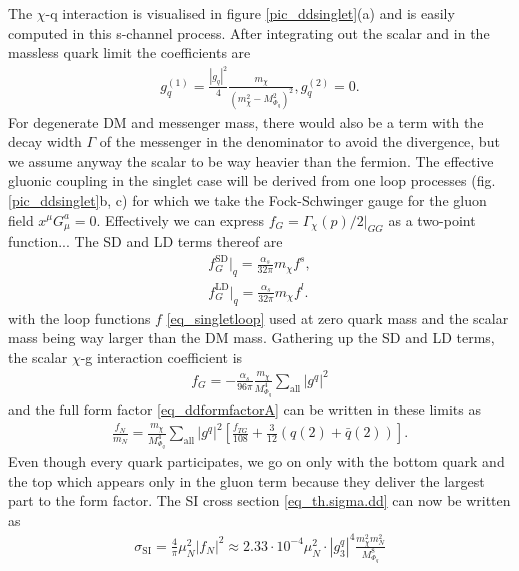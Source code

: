 The $\chi$-q interaction is visualised in figure \ref{pic_ddsinglet}(a) and is easily computed in this s-channel process. After integrating out the 
scalar and in the massless quark limit the coefficients are
\begin{align}
 g_q^{(1)} = \frac{|g_q|^2 }{4} \frac{m_\chi}{\left(m_\chi^2 - M_{\Phi_q}^2\right)^2},
 g_q^{(2)} = 0.
\end{align}
For degenerate DM and messenger mass, there would also be a term with the decay width $\Gamma$ of the messenger in the denominator to avoid the 
divergence, but we assume anyway the scalar to be way heavier than the fermion. %
The effective gluonic coupling in the 
singlet case will be derived from one loop processes (fig. \ref{pic_ddsinglet}b, c) 
for which we take the Fock-Schwinger gauge for the gluon
field $x^\mu G^a_\mu = 0$. Effectively we can express $f_G = \Gamma_\chi(p)/2|_{GG}$ as a two-point function... The SD and LD terms thereof are
\begin{align}
 f_G^\text{SD}|_q = \frac{\alpha_s}{32\pi} m_\chi f^s,\\
 f_G^\text{LD}|_q = \frac{\alpha_s}{32\pi} m_\chi f^l.
 \label{eq_ldsdLoop}
\end{align}
with the loop functions $f$ \eqref{eq_singletloop} used at zero quark mass and the scalar mass being way larger than the DM mass.
Gathering up the SD and LD terms, the scalar $\chi$-g interaction coefficient is
\begin{align}
 f_G = -\frac{\alpha_s}{96\pi} \frac{m_\chi}{M_{\Phi_q}^4} \sum\limits_{\text{all}} |g^q|^2
\end{align}
and the full form factor \eqref{eq_ddformfactorA} can be written in these limits as
\begin{align}
 \frac{f_N}{m_N} = \frac{m_\chi}{M_{\Phi_q}^4} \sum\limits_\text{all} \left|g^q\right|^2 \left[\frac{f_{TG}}{108} + \frac{3}{12}\left(q(2) + \bar q(2)\right)\right].
\end{align}
Even though every quark participates, we go on only with the bottom quark and the top which appears only in the gluon term because they deliver the
largest part to the form factor. The SI cross section \eqref{eq_th.sigma.dd} can now be written as
\begin{align}
 \sigma_\text{SI} = \frac{4}{\pi}\mu_N^2 \left| f_N \right| ^2 \approx 2.33\cdot 10^{-4} \mu_N^2 \cdot |g^q_3|^4 \frac{m_\chi^2 m_N^2}{M_{\Phi_q}^8}
 \label{eq_sigmaDDA}
\end{align}
